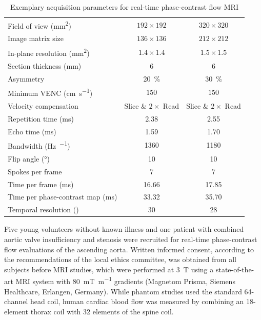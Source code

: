 \begin{table}[tb]
  \caption{Exemplary acquisition parameters for real-time phase-contrast flow MRI}
  \label{Tab:asym-echo-acq}
  \begin{center}
	\begin{tabular}{ l 
					 c 
					 c 
				   }
	  \toprule
	  Field of view (\si{\square\mm})        & $192 \times 192$        & $320 \times 320$ \\
	  Image matrix size                      & $136 \times 136$        & $212 \times 212$ \\
	  In-plane resolution (\si{\square\mm})  & $1.4 \times 1.4$        & $1.5 \times 1.5$ \\
	  Section thickness (\si{\mm})           & $6$                     & $6$              \\
	  Asymmetry                              & \SI{20}{\percent}     & \SI{30}{\percent} \\
	  Minimum VENC (\si{\cm\per\second})     & $150$                   & $150$               \\
	  Velocity compensation                  & Slice \& $2\times$ Read & Slice \& $2\times$ Read \\
	  Repetition time (\si{\ms})             & 2.38                  & 2.55 \\
	  Echo time (\si{\ms})                   & 1.59                  & 1.70 \\
	  Bandwidth (\si{\hertz\per\pixel})      & 1360                  & 1180 \\
	  Flip angle (\si{\degree})              & 10                    & 10 \\
	  Spokes per frame                       & 7                     & 7 \\
	  Time per frame (\si{\ms})              & 16.66                 & 17.85 \\
	  Time per phase-contrast map (\si{\ms}) & 33.32                 & 35.70 \\
	  Temporal resolution (\si{\fps})        & 30                    & 28 \\
	  \bottomrule
    \end{tabular}
  \end{center}
\end{table}

Five young volunteers without known illness and one patient with combined aortic valve insufficiency and stenosis were recruited for real-time phase-contrast flow evaluations of the ascending aorta. Written informed consent, according to the recommendations of the local ethics committee, was obtained from all subjects before MRI studies, which were performed at \SI{3}{\tesla} using a state-of-the-art MRI system with \SI{80}{\milli\tesla\per\meter} gradients (Magnetom Prisma, Siemens Healthcare, Erlangen, Germany). While phantom studies used the standard \num{64}-channel head coil, human cardiac blood flow was measured by combining an \num{18}-element thorax coil with \num{32} elements of the spine coil. 

